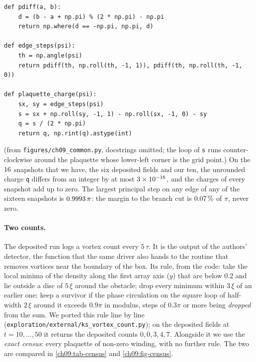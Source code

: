 \par\noindent\begin{minipage}{\linewidth}
\begin{lstlisting}[style=py]
def pdiff(a, b):
    d = (b - a + np.pi) % (2 * np.pi) - np.pi
    return np.where(d == -np.pi, np.pi, d)

def edge_steps(psi):
    th = np.angle(psi)
    return pdiff(th, np.roll(th, -1, 1)), pdiff(th, np.roll(th, -1, 0))

def plaquette_charge(psi):
    sx, sy = edge_steps(psi)
    s = sx + np.roll(sy, -1, 1) - np.roll(sx, -1, 0) - sy
    q = s / (2 * np.pi)
    return q, np.rint(q).astype(int)
\end{lstlisting}
\end{minipage}\par
\noindent (from \texttt{figures/ch09\_common.py}, docstrings omitted; the loop of \texttt{s} runs counter-clockwise around the plaquette whose lower-left corner is the grid point.) On the $16$ snapshots that we have, the six deposited fields and our ten, the unrounded charge \texttt{q} differs from an integer by at most $3\times10^{-16}$, and the charges of every snapshot add up to zero. The largest principal step on any edge of any of the sixteen snapshots is $0.9993\,\pi$: the margin to the branch cut is $0.07\,\%$ of $\pi$, never zero.

\paragraph{Two counts.} The deposited run logs a vortex count every $5\,\tau$. It is the output of the authors' detector, the function that the same driver also hands to the routine that removes vortices near the boundary of the box. Its rule, from the code: take the local minima of the density along the first array axis ($y$) that are below $0.2$ and lie outside a disc of $5\,\xi$ around the obstacle; drop every minimum within $3\,\xi$ of an earlier one; keep a survivor if the phase circulation on the square loop of half-width $2\,\xi$ around it exceeds $0.9\pi$ in modulus, steps of $0.3\pi$ or more being \emph{dropped} from the sum. We ported this rule line by line (\texttt{exploration/external/ks\_vortex\_count.py}); on the deposited fields at $t=10,\dots,50$ it returns the deposited counts $0,0,3,4,7$. Alongside it we use the \emph{exact census}: every plaquette of non-zero winding, with no further rule. The two are compared in \cref{ch09:tab-census} and \cref{ch09:fig-census}.

